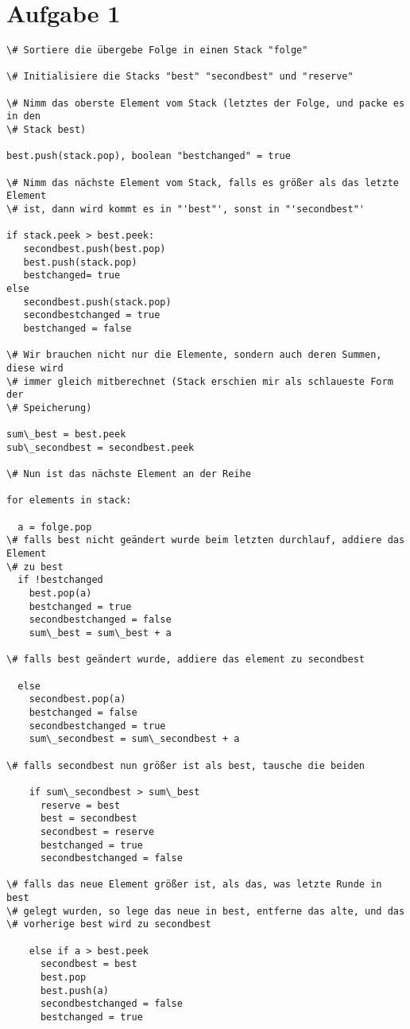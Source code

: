 \documentclass{article}
\begin{document}
\section*{Aufgabe 1}

\begin{verbatim}
\# Sortiere die übergebe Folge in einen Stack "folge"

\# Initialisiere die Stacks "best" "secondbest" und "reserve"

\# Nimm das oberste Element vom Stack (letztes der Folge, und packe es in den 
\# Stack best)

best.push(stack.pop), boolean "bestchanged" = true

\# Nimm das nächste Element vom Stack, falls es größer als das letzte Element 
\# ist, dann wird kommt es in "'best"', sonst in "'secondbest"'

if stack.peek > best.peek: 
   secondbest.push(best.pop)
   best.push(stack.pop)
   bestchanged= true
else
   secondbest.push(stack.pop)
   secondbestchanged = true
   bestchanged = false 

\# Wir brauchen nicht nur die Elemente, sondern auch deren Summen, diese wird 
\# immer gleich mitberechnet (Stack erschien mir als schlaueste Form der 
\# Speicherung)

sum\_best = best.peek
sub\_secondbest = secondbest.peek 

\# Nun ist das nächste Element an der Reihe

for elements in stack:
 
  a = folge.pop
\# falls best nicht geändert wurde beim letzten durchlauf, addiere das Element
\# zu best
  if !bestchanged
    best.pop(a)
    bestchanged = true
    secondbestchanged = false
    sum\_best = sum\_best + a

\# falls best geändert wurde, addiere das element zu secondbest

  else 
    secondbest.pop(a)
    bestchanged = false
    secondbestchanged = true
    sum\_secondbest = sum\_secondbest + a

\# falls secondbest nun größer ist als best, tausche die beiden

    if sum\_secondbest > sum\_best
      reserve = best
      best = secondbest
      secondbest = reserve
      bestchanged = true
      secondbestchanged = false

\# falls das neue Element größer ist, als das, was letzte Runde in best 
\# gelegt wurden, so lege das neue in best, entferne das alte, und das 
\# vorherige best wird zu secondbest

    else if a > best.peek
      secondbest = best
      best.pop
      best.push(a)
      secondbestchanged = false
      bestchanged = true

 
\end{verbatim}     
\end{document}
